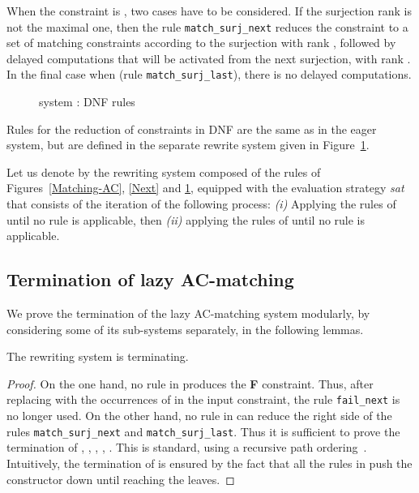 \documentclass[submission,copyright,creativecommons]{eptcs}
\numberwithin{subcase}{case}
\begin{document}
When the constraint is , two cases have to be considered.  If the
surjection rank  is not the maximal one, then the rule
\texttt{match\_surj\_next} reduces the constraint
 to a set of matching constraints according to
the surjection with rank ,
 followed by  delayed computations that will
be activated from the next surjection, with rank .
In the final case when  (rule \texttt{match\_surj\_last}), there is
no delayed computations.
 
\begin{figure}[hbt!]

\caption{ system : DNF  rules \label{Simplify}}
\end{figure}

Rules for the reduction of constraints in DNF are the same as in the eager
system, but are defined in the separate rewrite system  given in
Figure~\ref{Simplify}.


Let us denote by  the
rewriting system  composed of the 
 rules of Figures~\ref{Matching-AC}, \ref{Next} and
 \ref{Simplify}, equipped with the evaluation strategy \emph{sat} that consists of 
the iteration of the following process:
\emph{(i)} Applying the rules of  until no
rule is applicable, then \emph{(ii)} applying the rules of 
until no rule is applicable.



\subsection{Termination of lazy AC-matching}
We prove the termination of the lazy AC-matching system 
modularly, by considering some of its sub-systems separately, in the following lemmas. 

\begin{lemma}\label{R2:termination:lemma}
The rewriting system  is terminating.
\end{lemma}
\begin{proof}
On the one hand, no rule in  produces the \textbf{F}
constraint. Thus, after replacing with  the occurrences of
 in the input constraint, the rule \texttt{fail\_next} is no longer used.
On the other hand, no rule in  can reduce the right side of the
rules \texttt{match\_surj\_next} and \texttt{match\_surj\_last}. 
Thus it is sufficient to prove the termination of 
, ,
 , , .
This is standard, using a recursive path ordering~\cite{Dersh_Ordering82}.
Intuitively, the termination of  is ensured by the fact that all the rules
in  push the  constructor down until reaching the leaves. 
\end{proof}
\end{document}

